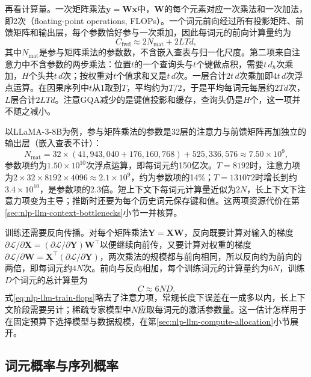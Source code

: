 再看计算量。一次矩阵乘法$\bm y=\bm W\bm x$中，$\bm W$的每个元素对应一次乘法和一次加法，即2次（floating-point operations, FLOPs）。一个词元前向经过所有投影矩阵、前馈矩阵和输出层，每个参数恰好参与一次乘加，因此每词元的前向计算量约为
\begin{equation}
  C_{\mathrm{fwd}}\approx2N_{\mathrm{mat}}+2LTd,
  \label{eq:nlp-llm-forward-flops}
\end{equation}
其中$N_{\mathrm{mat}}$是参与矩阵乘法的参数数，不含嵌入查表与归一化尺度。第二项来自注意力中不含参数的两步乘法：位置$t$的一个查询头与$t$个键做点积，需要$t\,d_h$次乘加，$H$个头共$t\,d$次；按权重对$t$个值求和又是$t\,d$次。一层合计$2t\,d$次乘加即$4t\,d$次浮点运算。在因果序列中$t$从1取到$T$，平均约为$T/2$，于是平均每词元每层约$2Td$次，$L$层合计$2LTd$。注意GQA减少的是键值投影和缓存，查询头仍是$H$个，这一项并不随之减小。

以LLaMA-3-8B为例，参与矩阵乘法的参数是32层的注意力与前馈矩阵再加独立的输出层（嵌入查表不计）：
\[
  N_{\mathrm{mat}}=32\times(41{,}943{,}040+176{,}160{,}768)+525{,}336{,}576\approx7.50\times10^{9},
\]
参数项约为$1.50\times10^{10}$次浮点运算，即每词元约150亿次。$T=8192$时，注意力项为$2\times32\times8192\times4096\approx2.1\times10^{9}$，约为参数项的14\%；$T=131072$时增长到约$3.4\times10^{10}$，是参数项的2.3倍。短上下文下每词元计算量近似为$2N$，长上下文下注意力项变为主导；推断时还要为每个历史词元保存键和值。这两项资源代价在第\ref{sec:nlp-llm-context-bottlenecks}小节一并核算。

训练还需要反向传播。对每个矩阵乘法$\bm Y=\bm X\bm W$，反向既要计算对输入的梯度$\partial\mathcal L/\partial\bm X=(\partial\mathcal L/\partial\bm Y)\bm W^{\top}$以便继续向前传，又要计算对权重的梯度$\partial\mathcal L/\partial\bm W=\bm X^{\top}(\partial\mathcal L/\partial\bm Y)$，两次乘法的规模都与前向相同，所以反向约为前向的两倍，即每词元约$4N$次。前向与反向相加，每个训练词元的计算量约为$6N$，训练$D$个词元的总计算量为
\begin{equation}
  C\approx6ND.
  \label{eq:nlp-llm-train-flops}
\end{equation}
式\eqref{eq:nlp-llm-train-flops}略去了注意力项，常规长度下误差在一成多以内，长上下文阶段需要另计；稀疏专家模型中$N$应取每词元的激活参数量。这一估计怎样用于在固定预算下选择模型与数据规模，在第\ref{sec:nlp-llm-compute-allocation}小节展开。

\subsection{词元概率与序列概率}
\label{sec:nlp-llm-probabilities}

